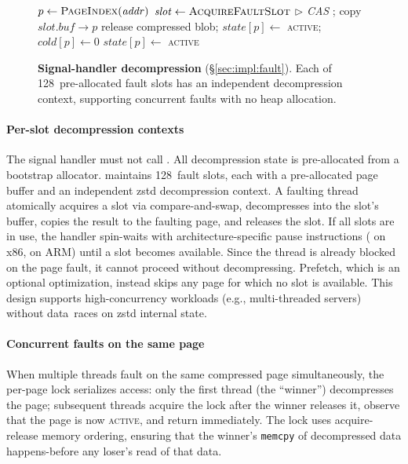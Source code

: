 \begin{figure}[t]
\begin{algorithmic}[1]
  \State $p \gets \Call{PageIndex}{\mathit{addr}}$
  \State {}
      \State $\mathit{slot} \gets \Call{AcquireFaultSlot}{}$
      $\triangleright$ \textit{CAS}
      \State {}
      \State {};\; copy $\mathit{slot.buf} \to p$
      \State release compressed blob;\; 
      \State $\mathit{state}[p] \gets$ \textsc{active};\; $\mathit{cold}[p] \gets 0$
      \State {}
      \State {}
      \State $\mathit{state}[p] \gets$ \textsc{active}
  \EndIf
  \State {}
\EndFunction
\end{algorithmic}
\caption{\textbf{Signal-handler decompression}
  (\S\ref{sec:impl:fault}).  Each of 128~pre-allocated fault slots
  has an independent decompression context, supporting concurrent
  faults with no heap allocation.}
\label{fig:algo:fault}
\end{figure}

\paragraph{Per-slot decompression contexts}
The signal handler must not call .  All decompression
state is pre-allocated from a bootstrap allocator.  \sys maintains
128~fault slots, each with a pre-allocated page buffer and an
independent zstd decompression context.  A faulting thread atomically
acquires a slot via compare-and-swap, decompresses into the slot's
buffer, copies the result to the faulting page, and releases the slot.
If all slots are in use, the handler spin-waits with
architecture-specific pause instructions ( on x86,  on ARM) until
a slot becomes available.  Since the thread is already blocked on the
page fault, it cannot proceed without decompressing.  Prefetch, which is
an optional optimization, instead skips any page for which no slot is
available.  This design supports high-concurrency workloads (e.g.,
multi-threaded servers) without data~races on zstd internal state.

\paragraph{Concurrent faults on the same page}
When multiple threads fault on the same compressed page simultaneously,
the per-page lock serializes access: only the first thread (the ``winner'')
decompresses the page; subsequent threads acquire the lock after the
winner releases it, observe that the page is now \textsc{active}, and
return immediately.  The lock uses acquire-release memory ordering,
ensuring that the winner's \texttt{memcpy} of decompressed data
happens-before any loser's read of that data.

